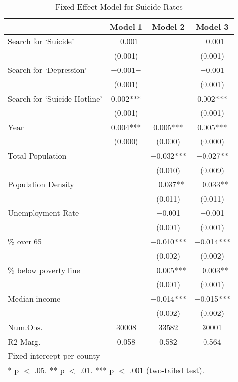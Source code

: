 \begin{table}[!h]

\caption{\label{tab:suicide_analysis}Fixed Effect Model for Suicide Rates}
\centering
\fontsize{8}{10}\selectfont

\begin{tabular}{lccc}
\toprule
  & Model 1 & Model 2 & Model 3\\
\midrule

Search for `Suicide' & \num{-0.001} &  & \num{-0.001}\\
 & (\num{0.001}) &  & \vphantom{2} (\num{0.001})\\
Search for `Depression' & \num{-0.001}+ &  & \num{-0.001}\\
 & (\num{0.001}) &  & \vphantom{1} (\num{0.001})\\
Search for `Suicide Hotline' & \num{0.002}*** &  & \num{0.002}***\\
 & (\num{0.001}) &  & (\num{0.001})\\
Year & \num{0.004}*** & \num{0.005}*** & \num{0.005}***\\
 & (\num{0.000}) & (\num{0.000}) & (\num{0.000})\\
Total Population &  & \num{-0.032}*** & \num{-0.027}**\\
 &  & (\num{0.010}) & (\num{0.009})\\
Population Density &  & \num{-0.037}** & \num{-0.033}**\\
 &  & (\num{0.011}) & (\num{0.011})\\
Unemployment Rate &  & \num{-0.001} & \num{-0.001}\\
 &  & (\num{0.001}) & \vphantom{1} (\num{0.001})\\
\% over 65 &  & \num{-0.010}*** & \num{-0.014}***\\
 &  & (\num{0.002}) & \vphantom{1} (\num{0.002})\\
\% below poverty line &  & \num{-0.005}*** & \num{-0.003}**\\
 &  & (\num{0.001}) & (\num{0.001})\\
Median income &  & \num{-0.014}*** & \num{-0.015}***\\
 &  & (\num{0.002}) & (\num{0.002})\\
\midrule
Num.Obs. & \num{30008} & \num{33582} & \num{30001}\\
R2 Marg. & \num{0.058} & \num{0.582} & \num{0.564}\\
\bottomrule
\multicolumn{4}{l}{\rule{0pt}{1em}Fixed intercept per county}\\
\multicolumn{4}{l}{\rule{0pt}{1em}* p $<$ .05. ** p $<$ .01. *** p $<$ .001 (two-tailed test).}\\
\end{tabular}
\end{table}